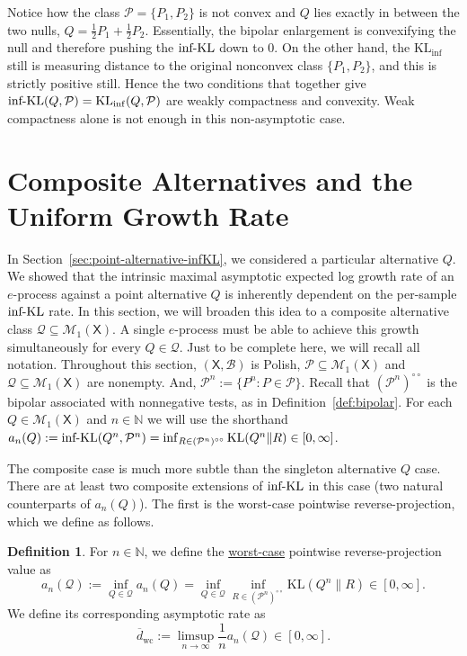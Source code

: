 \documentclass[11pt]{article}
\newcommand{\KL}{\mathrm{KL}}
\newcommand{\KLinf}{\mathrm{KL}_{\mathrm{inf}}}
\newcommand{\infKL}{\textnormal{inf-KL}}
\newcommand{\Pcal}{\mathcal{P}}
\newcommand{\Qcal}{\mathcal{Q}}
\newcommand{\X}{\mathsf{X}}
\newcommand{\B}{\mathcal{B}}
\newcommand{\bPn}{(\mathcal{P}^n)^{\circ\circ}}
\theoremstyle{definition}
\newtheorem{definition}[theorem]{Definition}
\theoremstyle{definition}
\begin{document}
Notice how the class $\mathcal P=\{P_1, P_2\}$ is not convex and $Q$ lies exactly in between the two nulls, $Q=\frac{1}{2}P_1 + \frac{1}{2}P_2$. Essentially, the bipolar enlargement is convexifying the null and therefore pushing the $\infKL$ down to $0$. On the other hand, the $\KLinf$ still is measuring distance to the original nonconvex class $\{P_1,P_2\}$, and this is strictly positive still. Hence the two conditions that together give $\infKL(Q,\Pcal)=\KLinf(Q,\Pcal)$ are weakly compactness and convexity. Weak compactness alone is not enough in this non-asymptotic case.

\section{Composite Alternatives and the Uniform Growth Rate}\label{sec:compQintrins}
In Section~\ref{sec:point-alternative-infKL}, we considered a particular alternative $Q$. We showed that the intrinsic maximal asymptotic expected log growth rate of an $e$-process against a point alternative $Q$ is inherently dependent on the per-sample $\infKL$ rate. In this section, we will broaden this idea to a composite alternative class $\Qcal\subseteq\mathcal M_1(\X)$. A single $e$-process must be able to achieve this growth simultaneously for every $Q\in\Qcal$. Just to be complete here, we will recall all notation. Throughout this section, $(\X,\B)$ is Polish, $\Pcal\subseteq\mathcal M_1(\X)$ and $\Qcal\subseteq\mathcal M_1(\X)$ are nonempty. And, $\Pcal^n:=\{P^n:P\in\Pcal\}$. Recall that $(\Pcal^n)^{\circ\circ}$ is the bipolar associated with nonnegative tests, as in Definition~\ref{def:bipolar}. For each $Q\in\mathcal M_1(\X)$ and $n\in\mathbb N$ we will use the shorthand $a_n(Q):=\infKL(Q^n,\Pcal^n)=\inf_{R\in(\Pcal^n)^{\circ\circ}}\KL(Q^n\|R)\in[0,\infty]$.

The composite case is much more subtle than the singleton alternative $Q$ case. There are at least two composite extensions of $\infKL$ in this case (two natural counterparts of $a_n(Q)$). The first is the worst-case pointwise reverse-projection, which we define as follows.

\begin{definition}\label{def:an-worstcase-pointwise}
For  $n\in\mathbb N$, we define the \underline{worst-case} pointwise reverse-projection value as
\[
a_n(\Qcal):=\inf_{Q\in\Qcal} a_n(Q)=\inf_{Q\in\Qcal}\inf_{R\in\bPn}\KL(Q^n\|R)\in[0,\infty].
\]
We define its corresponding asymptotic rate as
\[
\overline d_{\mathrm{wc}}:=\limsup_{n\to\infty}\frac{1}{n}a_n(\Qcal)\in[0,\infty].
\]
\end{definition}
\end{document}
